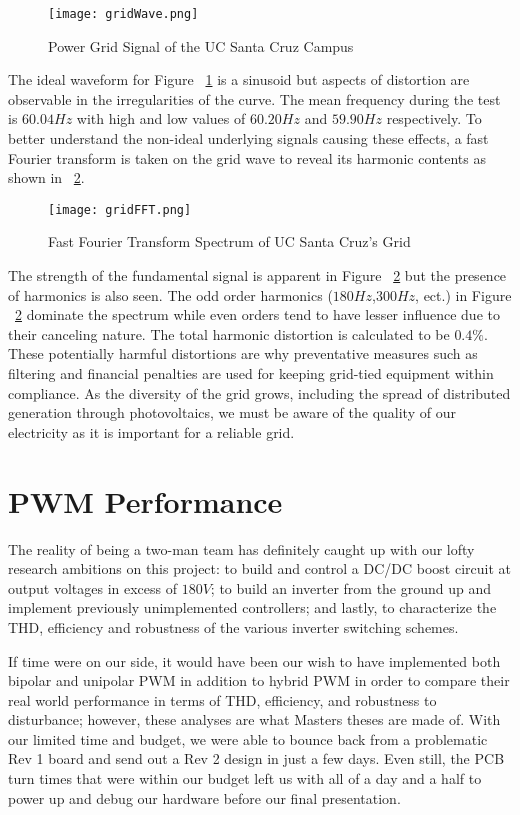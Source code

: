 \begin{figure}
\centering
\texttt{[image: gridWave.png]}
\caption{Power Grid Signal of the UC Santa Cruz Campus}
\label{gridWave}
\end{figure}

The ideal waveform for Figure ~\ref{gridWave} is a sinusoid but aspects of distortion are observable in the irregularities of the curve. The mean frequency during the test is $60.04 Hz$ with high and low values of $60.20 Hz$ and $59.90 Hz$ respectively. To better understand the non-ideal underlying signals causing these effects, a fast Fourier transform is taken on the grid wave to reveal its harmonic contents as shown in ~\ref{gridFFT}.

\begin{figure}
\centering
\texttt{[image: gridFFT.png]}
\caption{Fast Fourier Transform Spectrum of UC Santa Cruz's Grid}
\label{gridFFT}
\end{figure}

The strength of the fundamental signal is apparent in Figure ~\ref{gridFFT} but the presence of harmonics is also seen. The odd order harmonics ($180 Hz$,$300 Hz$, ect.) in  Figure ~\ref{gridFFT} dominate the spectrum while even orders tend to have lesser influence due to their canceling nature. The total harmonic distortion is calculated to be $0.4\%$. These potentially harmful distortions are why preventative measures such as filtering and financial penalties are used for keeping grid-tied equipment within compliance. As the diversity of the grid grows, including the spread of distributed generation through photovoltaics, we must be aware of the quality of our electricity as it is important for a reliable grid.

\section{PWM Performance}
The reality of being a two-man team has definitely caught up with our lofty research ambitions on this project: to build and control a DC/DC boost circuit at output voltages in excess of $180V$; to build an inverter from the ground up and implement previously unimplemented controllers; and lastly, to characterize the THD, efficiency and robustness of the various inverter switching schemes.

If time were on our side, it would have been our wish to have implemented both bipolar and unipolar PWM in addition to hybrid PWM in order to compare their real world performance in terms of THD, efficiency, and robustness to disturbance; however, these analyses are what Masters theses are made of. With our limited time and budget, we were able to bounce back from a problematic Rev 1 board and send out a Rev 2 design in just a few days. Even still, the PCB turn times that were within our budget left us with all of a day and a half to power up and debug our hardware before our final presentation. 

